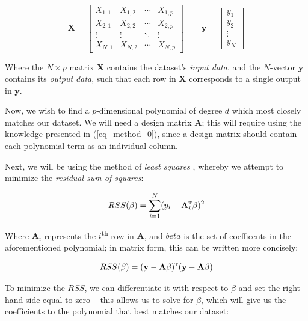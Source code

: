 \documentclass[a4paper,10pt,english]{article}
\begin{document}
\begin{multicols*}{2}
\begin{equation}
\label{eq_method_1}
\mathbf{X} = \begin{bmatrix} X_{1,1} & X_{1,2} & \cdots & X_{1,p} \\ X_{2,1} & X_{2,2} & \cdots & X_{2,p} \\ \vdots & \vdots & \ddots & \vdots \\ X_{N,1} & X_{N,2} & \cdots & X_{N,p} \end{bmatrix} \qquad \mathbf{y} = \begin{bmatrix} y_1 \\ y_2 \\ \vdots \\ y_N \end{bmatrix}
\end{equation}

Where the $N \times p$ matrix $\mathbf{X}$ contains the dataset's \textit{input data}, and the $N$-vector $\mathbf{y}$ contains its \textit{output data}, such that each row in $\mathbf{X}$ corresponds to a single output in $\mathbf{y}$.

Now, we wish to find a $p$-dimensional polynomial of degree $d$ which most closely matches our dataset. We will need a design matrix $\mathbf{A}$; this will require using the knowledge presented in (\ref{eq_method_0}), since a design matrix should contain each polynomial term as an individual column.

Next, we will be using the method of \textit{least squares} \cite{hastie_tibshirani_friedman_2013}, whereby we attempt to minimize the \textit{residual sum of squares}:

\begin{equation*}
RSS(\beta) = \sum_{i=1}^N (y_i - \mathbf{A}_i^\textsc{t} \beta)^2 
\end{equation*}

Where $\mathbf{A}_i$ represents the $i$\textsuperscript{th} row in $\mathbf{A}$, and $beta$ is the set of coefficents in the aforementioned polynomial; in matrix form, this can be written more concisely:

\begin{equation*}
RSS(\beta) = (\mathbf{y} - \mathbf{A} \beta)^\textsc{t}(\mathbf{y} - \mathbf{A} \beta)
\end{equation*}

To minimize the $RSS$, we can differentiate it with respect to $\beta$ and set the right-hand side equal to zero – this allows us to solve for $\beta$, which will give us the coefficients to the polynomial that best matches our dataset:


\end{multicols*}
\end{document}
